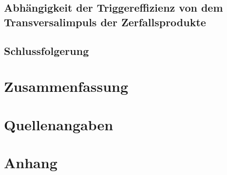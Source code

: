 \documentclass[12pt,a4paper]{article}
\begin{document}
\subsection{Abhängigkeit der Triggereffizienz von dem Transversalimpuls der Zerfallsprodukte}
\subsection{Schlussfolgerung}
\section{Zusammenfassung}
\section{Quellenangaben}
\section{Anhang}
\end{document}
